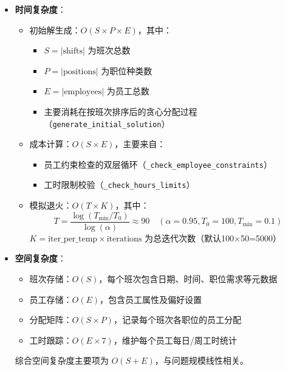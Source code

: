 \begin{itemize}
    \item \textbf{时间复杂度}：
    \begin{itemize}
        \item 初始解生成：$O(S \times P \times E)$，其中：
        \begin{itemize}
            \item $S = |\text{shifts}|$ 为班次总数
            \item $P = |\text{positions}|$ 为职位种类数
            \item $E = |\text{employees}|$ 为员工总数
            \item 主要消耗在按班次排序后的贪心分配过程（\texttt{generate\_initial\_solution}）
        \end{itemize}
        
        \item 成本计算：$O(S \times E)$，主要来自：
        \begin{itemize}
            \item 员工约束检查的双层循环（\texttt{\_check\_employee\_constraints}）
            \item 工时限制校验（\texttt{\_check\_hours\_limits}）
        \end{itemize}
        
        \item 模拟退火：$O(T \times K)$，其中：
        \begin{equation}
            T = \frac{\log(T_{\min}/T_0)}{\log(\alpha)} \approx 90 \quad (\alpha=0.95, T_0=100, T_{\min}=0.1)
        \end{equation}
        $K = \text{iter\_per\_temp} \times \text{iterations}$ 为总迭代次数（默认100×50=5000）
    \end{itemize}

    \item \textbf{空间复杂度}：
    \begin{itemize}
        \item 班次存储：$O(S)$，每个班次包含日期、时间、职位需求等元数据
        \item 员工存储：$O(E)$，包含员工属性及偏好设置
        \item 分配矩阵：$O(S \times P)$，记录每个班次各职位的员工分配
        \item 工时跟踪：$O(E \times 7)$，维护每个员工每日/周工时统计
    \end{itemize}
    综合空间复杂度主要项为 $O(S + E)$，与问题规模线性相关。
\end{itemize}

